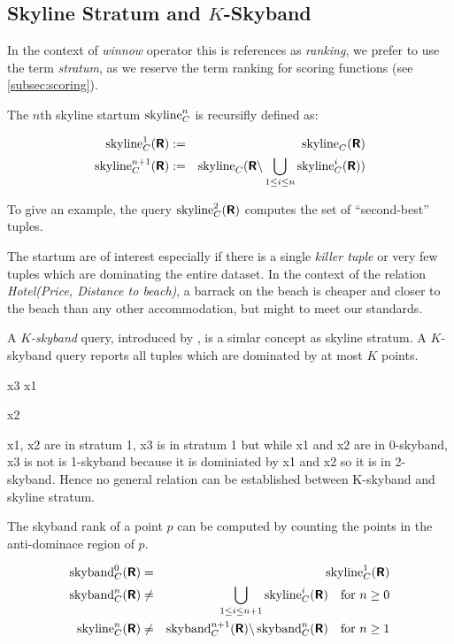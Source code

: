 \subsection{Skyline Stratum and $K$-Skyband}

In the context of \emph{winnow} operator this is references as \emph{ranking}, we prefer to use the term \emph{stratum}, as we reserve the term ranking for scoring functions (see \ref{subsec:scoring}).

The $n$th skyline startum $\skyline_C^n$ is recursifly defined as:

\begin{eqnarray}
\skyline_C^1(\relation{R}) & := & \skyline_C(\relation{R}) \\
\skyline_C^{n+1}(\relation{R}) & := & \skyline_C(\relation{R} \difference \bigunion_{1 \le i \le n} \skyline_C^i(\relation{R}))
\end{eqnarray}

To give an example, the query $\skyline_C^2(\relation{R})$ computes the set of ``second-best'' tuples.

The startum are of interest especially if there is a single
\emph{killer tuple} or very few tuples which are dominating the entire
dataset.  In the context of the relation \emph{Hotel(Price, Distance
to beach)}, a barrack on the beach is cheaper and closer to the beach
than any other accommodation, but might to meet our
standards. 

A \emph{$K$-skyband} query, introduced by \citet{Papadias2005}, is a simlar concept as skyline stratum. A $K$-skyband query reports all tuples which are dominated by at most $K$ points.

        x3
  x1  
 
    x2

x1, x2 are in stratum 1, x3 is in stratum 1 but while x1 and x2 are in 0-skyband, x3 is not is 1-skyband because it is dominiated by x1 and x2 so it is in 2-skyband. Hence no general relation can be established between K-skyband and skyline stratum.

The skyband rank of a point $p$ can be computed by counting the points in the anti-dominace region of $p$.

\begin{eqnarray}
\skyband_C^0(\relation{R}) &=& \skyline_C^1(\relation{R}) \label{equ:skyband} \\
\skyband_C^n(\relation{R}) &\not=& \bigunion_{1 \le i \le n+1} \skyline_C^i(\relation{R}) \quad \textnormal{for}\ n \ge 0\label{equ:skybandgeneral} \\
\skyline_C^n(\relation{R}) &\not=& \skyband_C^{n+1}(\relation{R}) \difference \skyband_C^n(\relation{R}) \quad \textnormal{for}\ n \ge 1
\end{eqnarray}

